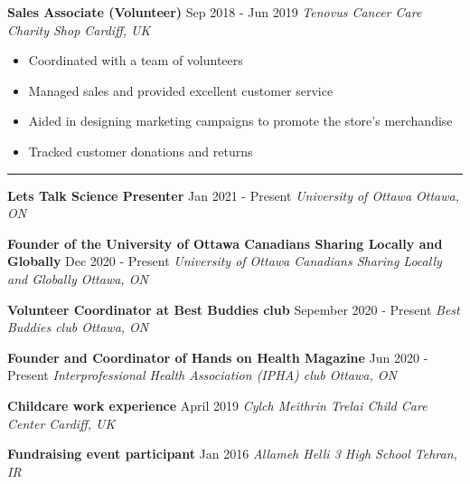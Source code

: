 \textbf{Sales Associate (Volunteer)} \hfill Sep 2018 - Jun 2019
\linebreak \emph{Tenovus Cancer Care Charity Shop \hfill Cardiff, UK}

\begin{itemize}
\tightlist
\item
  Coordinated with a team of volunteers
\item
  Managed sales and provided excellent customer service
\item
  Aided in designing marketing campaigns to promote the store's
  merchandise
\item
  Tracked customer donations and returns
\end{itemize}

\vspace{1em}

 \vspace{-1em}
\noindent

\rule{18cm}{0.5pt}

\textbf{Lets Talk Science Presenter} \hfill Jan 2021 - Present
\linebreak \emph{University of Ottawa \hfill Ottawa, ON}

\textbf{Founder of the University of Ottawa Canadians Sharing Locally
and Globally} \hfill Dec 2020 - Present \linebreak \emph{University of
Ottawa Canadians Sharing Locally and Globally \hfill Ottawa, ON}

\textbf{Volunteer Coordinator at Best Buddies club} \hfill Sepember 2020
- Present \linebreak  \emph{Best Buddies club \hfill Ottawa, ON}

\textbf{Founder and Coordinator of Hands on Health Magazine} \hfill Jun
2020 - Present \linebreak \emph{Interprofessional Health Association
(IPHA) club \hfill Ottawa, ON}

\textbf{Childcare work experience} \hfill April 2019 \linebreak
\emph{Cylch Meithrin Trelai Child Care Center \hfill Cardiff, UK}

\textbf{Fundraising event participant} \hfill Jan 2016 \linebreak
\emph{Allameh Helli 3 High School \hfill Tehran, IR}

